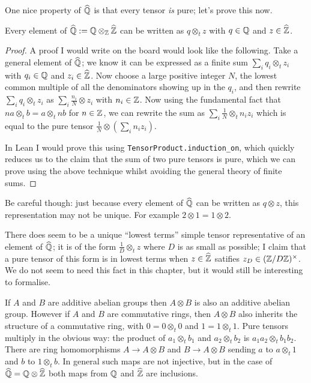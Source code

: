One nice property of $\widehat{\mathbb{Q}}$ is that every tensor \emph{is} pure; let's prove this now.

\begin{lemma}\label{Qhat.canonicalForm} Every element of $\widehat{\mathbb{Q}}:=\mathbb{Q}\otimes_{\mathbb{Z}}\widehat{\mathbb{Z}}$
can be written as $q\otimes_t z$ with $q\in\mathbb{Q}$ and $z\in\widehat{\mathbb{Z}}$.
\end{lemma}
\begin{proof} A proof I would write on the board would look like the following. Take a general 
    element of $\widehat{\mathbb{Q}}$; we know it can be expressed as a finite sum
    $\sum_i q_i\otimes_t z_i$ with $q_i\in\mathbb{Q}$ and $z_i\in\widehat{\mathbb{Z}}$. Now choose a large 
    positive integer $N$, the lowest common multiple of all the denominators showing up in the
    $q_i$, and then rewrite $\sum_i q_i\otimes_t z_i$ as $\sum_i \frac{n_i}{N}\otimes z_i$ with 
    $n_i\in\mathbb{Z}$. Now using the fundamental fact that $na\otimes_t b=a\otimes_t nb$ for $n\in\mathbb{Z}$,
    we can rewrite the sum as $\sum_i \frac{1}{N}\otimes_t n_i z_i$
    which is equal to the pure tensor $\frac{1}{N}\otimes(\sum_i n_i z_i)$.

    In Lean I would prove this using {\tt TensorProduct.induction_on}, which quickly
    reduces us to the claim that the sum of two pure tensors is pure, which we can prove
    using the above technique whilst avoiding the general theory of finite sums. 
\end{proof}

Be careful though: just because every element of $\widehat{\mathbb{Q}}$ can be written as $q\otimes z$, this
representation may not be unique. For example $2\otimes 1=1\otimes 2$.

\begin{remark} There does seem to be a unique ``lowest terms'' simple tensor representative of an 
    element of $\widehat{\mathbb{Q}}$; it is of the form $\frac{1}{D}\otimes_t z$ where $D$ is as small as
    possible; I claim that a pure tensor of this form is in lowest terms when $z\in\widehat{\mathbb{Z}}$ 
    satifies $z_D\in(\mathbb{Z}/D\mathbb{Z})^\times$. We do not seem to need this fact in this chapter, but it
    would still be interesting to formalise.
\end{remark}

If $A$ and $B$ are additive abelian groups then $A\otimes B$ is also an additive abelian group.
However if $A$ and $B$ are commutative rings, then $A\otimes B$ also inherits the structure
of a commutative ring, with $0=0\otimes_t 0$ and $1=1\otimes_t 1$. Pure tensors multiply in the 
obvious way: the product of $a_1\otimes_t b_1$ and $a_2\otimes_t b_2$ is $a_1a_2\otimes_t b_1b_2.$
There are ring homomorphisms $A\to A\otimes B$ and $B\to A\otimes B$ sending $a$ to $a\otimes_t 1$
and $b$ to $1\otimes_t b$. In general such maps are not injective, but in the case of
$\widehat{\mathbb{Q}}=\mathbb{Q}\otimes\widehat{\mathbb{Z}}$ both maps from $\mathbb{Q}$ and $\widehat{\mathbb{Z}}$ are inclusions.

